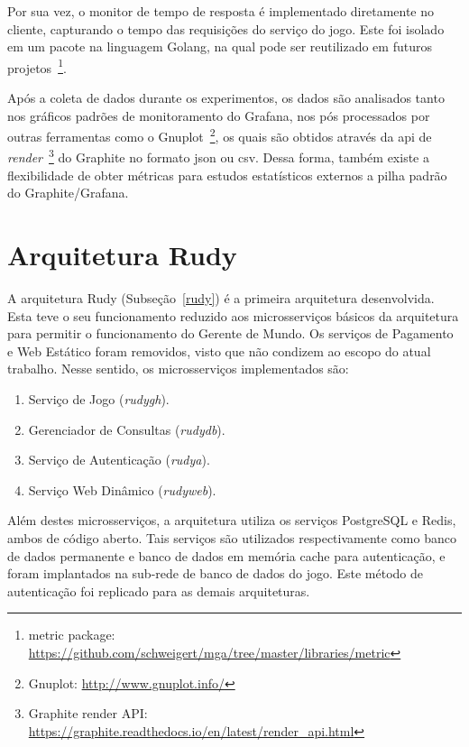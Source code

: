 Por sua vez, o monitor de tempo de resposta é implementado diretamente no cliente, capturando o tempo das requisições do serviço do jogo.
%
Este foi isolado em um pacote na linguagem Golang, na qual pode ser reutilizado em futuros projetos~\footnote{metric package: \url{https://github.com/schweigert/mga/tree/master/libraries/metric}}.

Após a coleta de dados durante os experimentos, os dados são analisados tanto nos gráficos padrões de monitoramento do Grafana, nos pós processados por outras ferramentas como o Gnuplot~\footnote{Gnuplot: \url{http://www.gnuplot.info/}}, os quais são obtidos através da \ac{api} de \textit{render}~\footnote{Graphite render API: \url{https://graphite.readthedocs.io/en/latest/render_api.html}} do Graphite no formato \ac{json} ou \ac{csv}.
%
Dessa forma, também existe a flexibilidade de obter métricas para estudos estatísticos externos a pilha padrão do Graphite/Grafana.



\section{Arquitetura Rudy}
\label{sec:arc_rudy}

A arquitetura Rudy (Subseção~\ref{rudy}) é a primeira arquitetura desenvolvida.
%
Esta teve o seu funcionamento reduzido aos microsserviços básicos da arquitetura para permitir o funcionamento do Gerente de Mundo.
%
Os serviços de Pagamento e Web Estático foram removidos, visto que não condizem ao escopo do atual trabalho.
%
Nesse sentido, os microsserviços implementados são:

\begin{enumerate}
    \item Serviço de Jogo (\textit{rudygh}).
    \item Gerenciador de Consultas (\textit{rudydb}).
    \item Serviço de Autenticação (\textit{rudya}).
    \item Serviço Web Dinâmico (\textit{rudyweb}).
\end{enumerate}

Além destes microsserviços, a arquitetura utiliza os serviços PostgreSQL e Redis, ambos de código aberto.
%
Tais serviços são utilizados respectivamente como banco de dados permanente e banco de dados em memória cache para autenticação, e foram implantados na sub-rede de banco de dados do jogo.
%
Este método de autenticação foi replicado para as demais arquiteturas.

